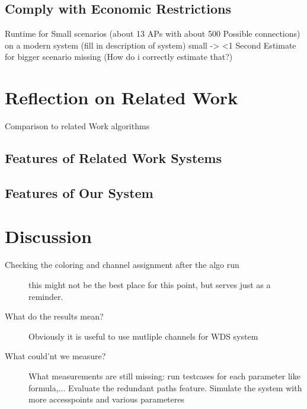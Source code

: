  \subsection{Comply with Economic Restrictions}
    Runtime for Small scenarios (about 13 APs with about 500 Possible connections) on a modern system (fill in description of system) small -> <1 Second
    Estimate for bigger scenario missing (How do i correctly estimate that?)
\section{Reflection on Related Work}
  Comparison to related Work algorithms\newline
  \subsection{Features of Related Work Systems}
  \subsection{Features of Our System}
\section{Discussion}
  \begin{description}
   \item [Checking the coloring and channel assignment after the algo run]
   this might not be the best place for this point, but serves just as a reminder.
   \item [What do the results mean?]
   Obviously it is useful to use mutliple channels for WDS system
   \item[What could'nt we measure?]
   What measurements are still missing:  run testcases for each parameter like formula,...
   Evaluate the redundant paths feature.
   Simulate the system with more accesspoints and various parameteres
  \end{description}